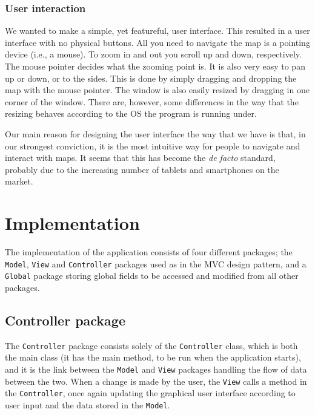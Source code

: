 \documentclass[a4paper,11pt]{article}
\begin{document}
\subsubsection{User interaction} %
\label{subsub:User interaction}
We wanted to make a simple, yet featureful, user interface. This resulted in a user interface with no physical buttons. All you need to navigate the map is a pointing device (i.e., a mouse). To zoom in and out you scroll up and down, respectively. The mouse pointer decides what the zooming point is. It is also very easy to pan up or down, or to the sides. This is done by simply dragging and dropping the map with the mouse pointer. The window is also easily resized by dragging in one corner of the window. There are, however, some differences in the way that the resizing behaves according to the OS the program is running under.

Our main reason for designing the user interface the way that we have is that, in our strongest conviction, it is the most intuitive way for people to navigate and interact with maps. It seems that this has become the \textit{de facto} standard, probably due to the increasing number of tablets and smartphones on the market.

\pagebreak
\section{Implementation} %
\label{sec:Implementation} %
The implementation of the application consists of four different packages; the \texttt{Model}, \texttt{View} and \texttt{Controller} packages used as in the MVC design pattern, and a \texttt{Global} package storing global fields to be accessed and modified from all other packages.


\subsection{Controller package} %
The \texttt{Controller} package consists solely of the \texttt{Controller} class, which is both the main class (it has the main method, to be run when the application starts), and it is the link between the \texttt{Model} and \texttt{View} packages handling the flow of data between the two. When a change is made by the user, the \texttt{View} calls a method in the \texttt{Controller}, once again updating the graphical user interface according to user input and the data stored in the \texttt{Model}.
\end{document}
